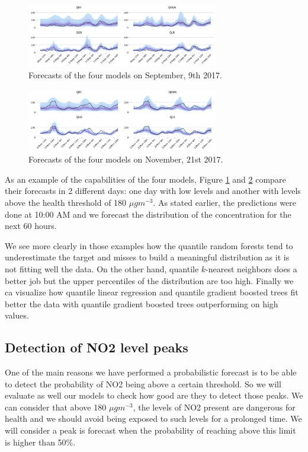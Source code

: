 \documentclass[a4paper,twocolumn,5p]{elsarticle}
\begin{document}
\begin{figure}
  \centering
  \includegraphics[width=0.75\textwidth]{evoday1}
  \caption{Forecasts of the four models on September, 9th
    2017.}
  \label{figure:evoday1} 
\end{figure}

\begin{figure}
  \centering
  \includegraphics[width=0.75\textwidth]{evoday2}
  \caption{Forecasts of the four models on November, 21st 2017.}
  \label{figure:evoday2} 
\end{figure}

As an example of the capabilities of the four models, Figure
\ref{figure:evoday1} and \ref{figure:evoday2} compare their forecasts
in 2 different days: one day with low \no levels and
another with levels above the health threshold of 180 $\mu gm^{-3}$.
As stated earlier, the predictions were done at 10:00 AM and we
forecast the distribution of the concentration for the next 60 hours.

We see more clearly in those examples how the quantile random forests 
tend to
underestimate the target and misses to build a meaningful distribution
as it is not fitting well the data. On the other hand, 
quantile $k$-nearest
neighbors does a better job but the upper percentiles of the
distribution are too high.  Finally we ca visualize how quantile linear 
regression and quantile gradient boosted trees fit better the 
data with quantile gradient boosted trees outperforming
 on high values.


\subsection{Detection of NO2 level peaks}

One of the main reasons we have performed a probabilistic forecast 
is to be able to detect the probability of NO2 being above a certain 
threshold. So we will evaluate as well our models to check how 
good are they to detect those peaks. 
We can consider that above 180 $\mu gm^{-3}$, 
the levels of NO2 present 
are dangerous for health and we should avoid being exposed to 
such levels for a prolonged time. 
We will consider a \no peak is forecast when the 
probability of reaching above this limit is higher 
than 50\%.
\end{document}
